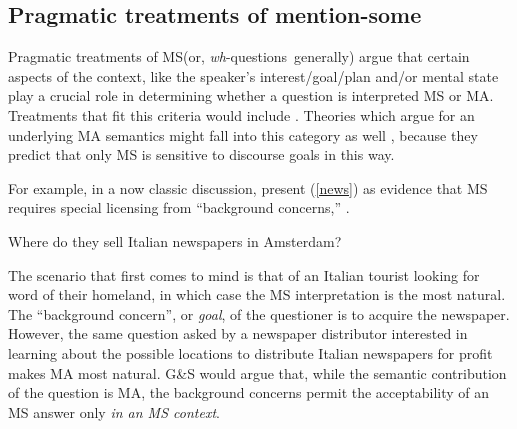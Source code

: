\documentclass[12pt,letterpaper,table,svgnames,dvipsnames]{article}
\newcommand{\whqs}{\emph{wh}-questions~}
\begin{document}
\subsection{Pragmatic treatments of mention-some}

Pragmatic treatments of MS(or, \whqs generally) argue that certain aspects of the context, like the speaker's interest/goal/plan and/or mental state play a crucial role in determining whether a question is interpreted MS or MA. Treatments that fit this criteria would include \cite{ginzburg1995,asherlascarides1998,vanrooij2003,vanrooij2004}. Theories which argue for an underlying MA semantics might fall into this category as well \cite{karttunen1977,groenstok1982,groenstok1984}, because they predict that only MS is sensitive to discourse goals in this way.

For example, in a now classic discussion, \cite{groenstok1982,groenstok1984} present (\ref{news}) as evidence that MS requires special licensing from ``background concerns,'' \cite[p.543]{groenstok1984}.
\begin{exe}
    \ex Where do they sell Italian newspapers in Amsterdam? \label{news}
\end{exe}
The scenario that first comes to mind is that of an Italian tourist looking for word of their homeland, in which case the MS interpretation is the most natural. The ``background concern'', or \emph{goal}, of the questioner is to acquire the newspaper. However, the same question asked by a newspaper distributor interested in learning about the possible locations to distribute Italian newspapers for profit makes MA most natural. G\&S would argue that, while the semantic contribution of the question is MA, the background concerns permit the acceptability of an MS answer only \emph{in an MS context}.
\end{document}
